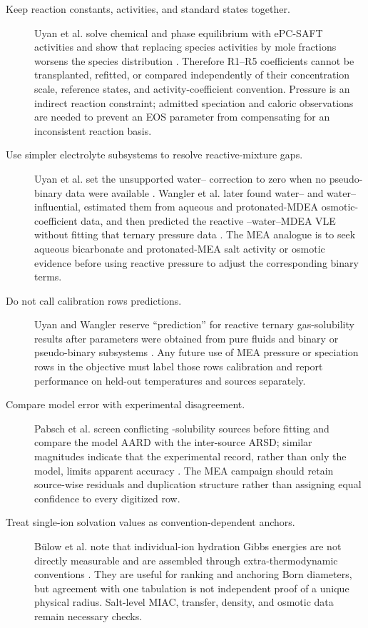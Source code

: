 \documentclass[10pt,oneside]{scrartcl}
\begin{document}
\begin{description}
\item[Keep reaction constants, activities, and standard states together.]
Uyan et al. solve chemical and phase equilibrium with ePC-SAFT activities and
show that replacing species activities by mole fractions worsens the species
distribution \cite[pp.~96--98]{Uyan2015}. Therefore R1--R5 coefficients cannot
be transplanted, refitted, or compared independently of their concentration
scale, reference states, and activity-coefficient convention. Pressure is an
indirect reaction constraint; admitted speciation and caloric observations are
needed to prevent an EOS parameter from compensating for an inconsistent
reaction basis.

\item[Use simpler electrolyte subsystems to resolve reactive-mixture gaps.]
Uyan et al. set the unsupported water-- correction to zero when no
pseudo-binary data were available \cite[p.~95]{Uyan2015}. Wangler et al. later
found water-- and water-- influential, estimated them from
aqueous  and protonated-MDEA osmotic-coefficient data, and then
predicted the reactive --water--MDEA VLE without fitting that ternary
pressure data \cite[pp.~19--24]{Wangler2018}. The MEA analogue is to seek
aqueous bicarbonate and protonated-MEA salt activity or osmotic evidence before
using reactive pressure to adjust the corresponding binary terms.

\item[Do not call calibration rows predictions.] Uyan and Wangler reserve
``prediction'' for reactive ternary gas-solubility results after parameters
were obtained from pure fluids and binary or pseudo-binary subsystems
\cite{Uyan2015,Wangler2018}. Any future use of MEA pressure or speciation rows
in the objective must label those rows calibration and report performance on
held-out temperatures and sources separately.

\item[Compare model error with experimental disagreement.] Pabsch et al.
screen conflicting -solubility sources before fitting and compare the
model AARD with the inter-source ARSD; similar magnitudes indicate that the
experimental record, rather than only the model, limits apparent accuracy
\cite[pp.~5771--5775]{Pabsch2020}. The MEA campaign should retain source-wise
residuals and duplication structure rather than assigning equal confidence to
every digitized row.

\item[Treat single-ion solvation values as convention-dependent anchors.]
B\"ulow et al. note that individual-ion hydration Gibbs energies are not
directly measurable and are assembled through extra-thermodynamic conventions
\cite[Sec.~3.2]{Bulow2020}. They are useful for ranking and anchoring Born
diameters, but agreement with one tabulation is not independent proof of a
unique physical radius. Salt-level MIAC, transfer, density, and osmotic data
remain necessary checks.


\end{description}
\end{document}
